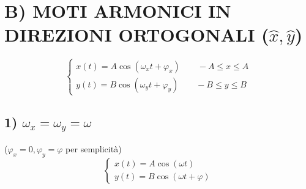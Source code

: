 \documentclass{article}
\begin{document}
\section*{B) MOTI ARMONICI IN DIREZIONI ORTOGONALI ($\hat{x}, \hat{y}$)}

\begin{equation*}
\begin{cases}
x(t) = A \cos(\omega_x t + \varphi_x) \qquad -A \le x \le A \\
y(t) = B \cos(\omega_y t + \varphi_y) \qquad -B \le y \le B
\end{cases}
\end{equation*}

\subsection*{1) $\omega_x = \omega_y = \omega$}
($\varphi_x = 0, \varphi_y = \varphi$ per semplicità)
\begin{equation*}
\begin{cases}
x(t) = A \cos(\omega t) \\
y(t) = B \cos(\omega t + \varphi)
\end{cases}
\end{equation*}
\end{document}
